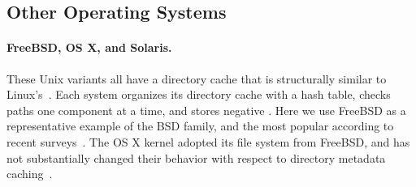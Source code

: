 \subsection{Other Operating Systems}

\paragraph{FreeBSD, OS X, and Solaris.}  These Unix variants all have a directory cache that is 
structurally similar to Linux's~\cite{osx-book, freebsd-book, solarisinternals}.  
Each system organizes its directory cache with a hash table, checks
paths one component at a time, and stores negative \dentries{}.
Here we use FreeBSD as a representative example of the BSD family, and the most popular according
to recent surveys~\cite{bsd-stats}.
The OS X kernel adopted its file system from FreeBSD, and has not substantially changed their behavior with
respect to directory metadata caching~\cite{lustre-xnu}.

